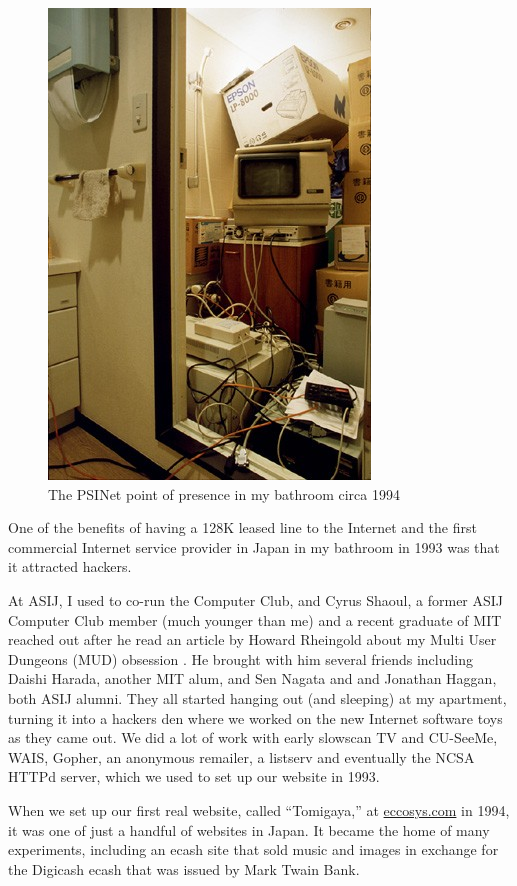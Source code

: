\begin{figure}[h]
 \centering
 \includegraphics[width=.5\textwidth]{pictures/Joibathroompop1994.jpg}
 \caption{The PSINet point of presence in my bathroom circa 1994}
 \label{bathroompop}
\end{figure}

One of the benefits of having a 128K leased line to the Internet and the first commercial Internet service provider in Japan in my bathroom in 1993 was that it attracted hackers.

At \ac{ASIJ}, I used to co-run the Computer Club, and Cyrus Shaoul, a former \ac{ASIJ} Computer Club member (much younger than me) and a recent graduate of MIT reached out after he read an article by Howard Rheingold about my Multi User Dungeons (MUD) obsession \cite{kelly1993dragon}. He brought with him several friends including Daishi Harada, another MIT alum, and Sen Nagata and and Jonathan Haggan, both \ac{ASIJ} alumni. They all started hanging out (and sleeping) at my apartment, turning it into a hackers den where we worked on the new Internet software toys as they came out. We did a lot of work with early slowscan TV and CU-SeeMe, WAIS, Gopher, an anonymous remailer, a listserv and eventually the NCSA HTTPd server, which we used to set up our website in 1993.

When we set up our first real website, called ``Tomigaya,'' at \href{https://web.archive.org/web/19961227001638/http://eccosys.com:80/}{eccosys.com} in 1994, it was one of just a handful of websites in Japan. It became the home of many experiments, including an ecash site that sold music and images in exchange for the Digicash ecash that was issued by Mark Twain Bank.

